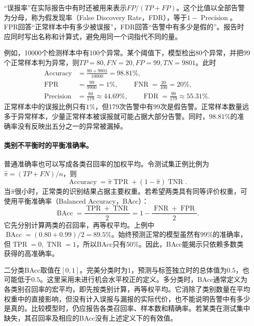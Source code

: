 “误报率”在实际报告中有时还被用来表示$FP/(TP+FP)$。这个比值以全部告警为分母，称为假发现率（False Discovery Rate，FDR），等于$1-\operatorname{Precision}$。FPR回答“正常样本中有多少被误报”，FDR回答“告警中有多少是假的”。报告时应同时写出名称和计算式，避免用同一个词指代不同的量。

例如，10000个检测样本中有100个异常。某个阈值下，模型检出80个异常，并把99个正常样本判为异常，则$TP=80,FN=20,FP=99,TN=9801$。此时
\begin{equation}
 \begin{aligned}
 \operatorname{Accuracy}&=\frac{80+9801}{10000}=98.81\%,\\
 \operatorname{FPR}&=\frac{99}{9900}=1\%,\qquad
 \operatorname{FNR}=\frac{20}{100}=20\%,\\
 \operatorname{Precision}&=\frac{80}{179}\approx44.69\%,\qquad
 \operatorname{FDR}=\frac{99}{179}\approx55.31\%.
 \end{aligned}
 \label{eq:classification-alarm-example}
\end{equation}
正常样本中的误报比例只有$1\%$，但179次告警中有99次是假告警。正常样本数量远多于异常样本，少量正常样本被误报就可能占据大部分告警。同时，$98.81\%$的准确率没有反映出五分之一的异常被漏掉。

\paragraph{类别不平衡时的平衡准确率。}
普通准确率也可以写成各类召回率的加权平均。令测试集正例比例为$\hat\pi=(TP+FN)/n$，则
\begin{equation}
 \operatorname{Accuracy}=\hat\pi\operatorname{TPR}
 +(1-\hat\pi)\operatorname{TNR}.
 \label{eq:classification-accuracy-prevalence}
\end{equation}
当$\hat\pi$很小时，正常类的识别结果占据主要权重。若希望两类具有同等评价权重，可使用平衡准确率（Balanced Accuracy，BAcc）：
\begin{equation}
 \operatorname{BAcc}=\frac{\operatorname{TPR}+\operatorname{TNR}}2
 =1-\frac{\operatorname{FNR}+\operatorname{FPR}}2.
 \label{eq:classification-balanced-accuracy}
\end{equation}
它先分别计算两类的召回率，再等权平均。上例中$\operatorname{BAcc}=(0.80+0.99)/2=89.5\%$。始终预测正常的模型虽然有$99\%$的准确率，但$\operatorname{TPR}=0,\operatorname{TNR}=1$，所以BAcc只有$50\%$。因此，BAcc能揭示只依赖多数类获得的高准确率。

二分类BAcc取值在$[0,1]$。完美分类时为1，预测与标签独立时的总体值为$0.5$，也可能低于$0.5$。这里采用未进行机会水平校正的定义。多分类时，BAcc通常定义为各类别召回率的宏平均，即先按类别计算，再等权平均。它消除了类别数量在平均权重中的直接影响，但没有计入误报与漏报的实际代价，也不能说明告警中有多少是真的。比较模型时，仍应报告各类召回率、样本数和精确率。若某类在测试集中缺失，其召回率及相应的BAcc没有上述定义下的有效值。

